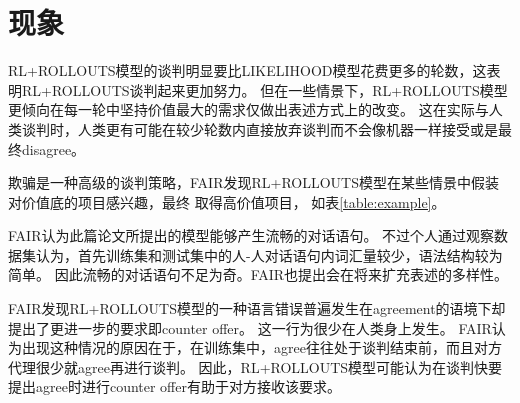 \section{现象}
\label{section:analysis}


RL+ROLLOUTS模型的谈判明显要比LIKELIHOOD模型花费更多的轮数，这表明RL+ROLLOUTS谈判起来更加努力。
但在一些情景下，RL+ROLLOUTS模型更倾向在每一轮中坚持价值最大的需求仅做出表述方式上的改变。
这在实际与人类谈判时，人类更有可能在较少轮数内直接放弃谈判而不会像机器一样接受或是最终disagree。

欺骗是一种高级的谈判策略，FAIR发现RL+ROLLOUTS模型在某些情景中假装对价值底的项目感兴趣，最终
取得高价值项目，
如表\ref{table:example}。

FAIR认为此篇论文所提出的模型能够产生流畅的对话语句。
不过个人通过观察数据集认为，首先训练集和测试集中的人-人对话语句内词汇量较少，语法结构较为简单。
因此流畅的对话语句不足为奇。FAIR也提出会在将来扩充表述的多样性。

FAIR发现RL+ROLLOUTS模型的一种语言错误普遍发生在agreement的语境下却提出了更进一步的要求即counter offer。
这一行为很少在人类身上发生。
FAIR认为出现这种情况的原因在于，在训练集中，agree往往处于谈判结束前，而且对方代理很少就agree再进行谈判。
因此，RL+ROLLOUTS模型可能认为在谈判快要提出agree时进行counter offer有助于对方接收该要求。